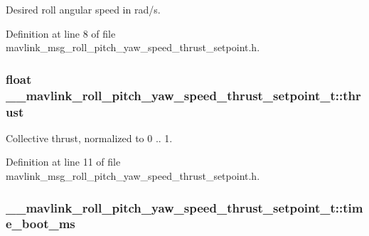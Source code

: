 Desired roll angular speed in rad/s. 



Definition at line 8 of file mavlink\-\_\-msg\-\_\-roll\-\_\-pitch\-\_\-yaw\-\_\-speed\-\_\-thrust\-\_\-setpoint.\-h.

\hypertarget{struct____mavlink__roll__pitch__yaw__speed__thrust__setpoint__t_ab28bd5d6a16896a4358b8f182d2b6a17}{
\subsubsection[{thrust}]{\setlength{\rightskip}{0pt plus 5cm}float \-\_\-\-\_\-mavlink\-\_\-roll\-\_\-pitch\-\_\-yaw\-\_\-speed\-\_\-thrust\-\_\-setpoint\-\_\-t\-::thrust}}\label{struct____mavlink__roll__pitch__yaw__speed__thrust__setpoint__t_ab28bd5d6a16896a4358b8f182d2b6a17}


Collective thrust, normalized to 0 .. 1. 



Definition at line 11 of file mavlink\-\_\-msg\-\_\-roll\-\_\-pitch\-\_\-yaw\-\_\-speed\-\_\-thrust\-\_\-setpoint.\-h.

\hypertarget{struct____mavlink__roll__pitch__yaw__speed__thrust__setpoint__t_a23cbdd8f2f256cee699824cb374c5efa}{
\subsubsection[{time\-\_\-boot\-\_\-ms}]{ \-\_\-\-\_\-mavlink\-\_\-roll\-\_\-pitch\-\_\-yaw\-\_\-speed\-\_\-thrust\-\_\-setpoint\-\_\-t\-::time\-\_\-boot\-\_\-ms}}\label{struct____mavlink__roll__pitch__yaw__speed__thrust__setpoint__t_a23cbdd8f2f256cee699824cb374c5efa}


